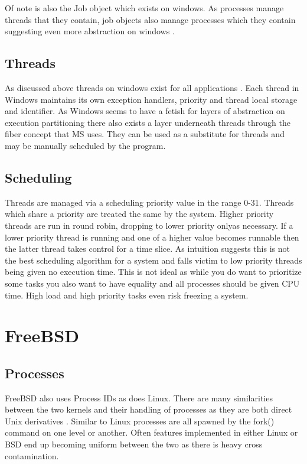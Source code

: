 \documentclass[letterpaper,10pt,notitlepage,fleqn]{article}
\begin{document}
Of note is also the Job object which exists on windows. As processes manage threads that 
they contain, job objects also manage processes which they contain suggesting even more 
abstraction on windows \cite{MSAbout}. 

\subsection{Threads}

As discussed above threads on windows exist for all applications \cite{MSAbout}. 
Each thread in Windows maintains its own exception handlers, priority and thread local
storage and identifier. As Windows seems to have a fetish for layers of abstraction on execution
partitioning there also exists a layer underneath threads through the fiber concept that MS 
uses. They can be used as a substitute for threads and may be manually scheduled by the program. 


\subsection{Scheduling}

Threads are managed via a scheduling priority value in the range 0-31. Threads 
which share a priority are treated the same by the system. Higher priority threads 
are run in round robin, dropping to lower priority onlyas necessary. If a 
lower priority thread is running and one of a higher value becomes runnable 
then the latter thread takes control for a time slice. \cite{MSScheduling} 
As intuition suggests this is not the best scheduling algorithm for a system and falls 
victim to low priority threads being given no execution time. This is not ideal as while you 
do want to prioritize some tasks you also want to have equality and all processes should be
given CPU time. High load and high priority tasks even risk freezing a system. 



\section{FreeBSD}

\subsection{Processes}

FreeBSD also uses Process IDs as does Linux. There are many similarities between the two 
kernels and their handling of processes as they are both direct Unix derivatives \cite{BSDPgen}. 
Similar to Linux processes are all spawned by the fork() command on one level or another. Often 
features implemented in either Linux or BSD end up becoming uniform between the two as there is 
heavy cross contamination.
\end{document}
